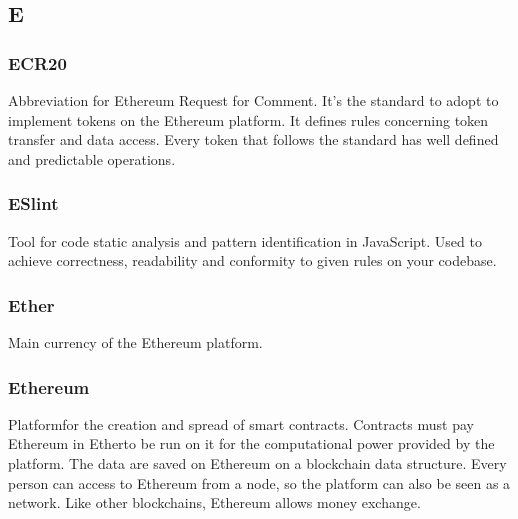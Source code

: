 \subsection*{E}

\subsubsection*{ECR20}
Abbreviation for Ethereum Request for Comment. It's the standard to adopt to implement tokens on the Ethereum platform.
It defines rules concerning token transfer and data access. Every token that follows the standard has well defined and predictable operations.


\subsubsection*{ESlint}
Tool for code static analysis and pattern identification in JavaScript. Used to achieve correctness, readability and conformity to given rules on your codebase.

\subsubsection*{Ether}
Main currency of the Ethereum platform\glo.

\subsubsection*{Ethereum}
Platform\glosp for the creation and spread of smart contracts\glo. Contracts must pay Ethereum in Ether\glosp to be run on it for the computational power provided by the platform. The data are saved on Ethereum on a blockchain data structure. Every person can access to Ethereum from a node, so the platform can also be seen as a network. 
Like other blockchains, Ethereum allows money exchange.



